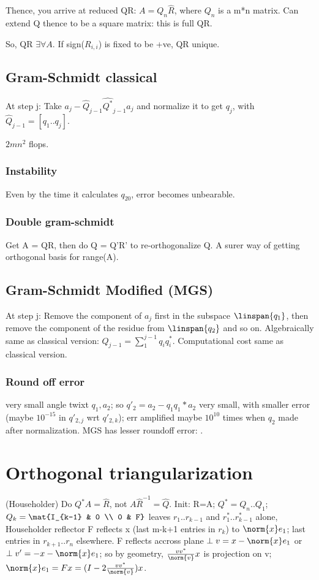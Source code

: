 \documentclass[oneside, article]{memoir}
\begin{document}
Thence, you arrive at reduced QR: $A=Q_n\hat{R}$, where $Q_n$ is a m*n matrix. Can extend Q thence to be a square matrix: this is full QR.

So, QR $\exists \forall A$. If sign($R_{i,i}$) is fixed to be +ve, QR unique. 

\subsection{Gram-Schmidt classical}
At step j: Take $a_j-\hat{Q}_{j-1}\hat{Q^{*}}_{j-1}a_j$ and normalize it to get $q_j$, with $\hat{Q}_{j-1} = [q_1 .. q_j]$.

$2mn^{2}$ flops.

\subsubsection{Instability}
Even by the time it calculates $q_{20}$, error becomes unbearable.

\subsubsection{Double gram-schmidt}
Get A = QR, then do Q = Q'R' to re-orthogonalize Q. A surer way of getting orthogonal basis for range(A).

\subsection{Gram-Schmidt Modified (MGS)}
At step j: Remove the component of $a_j$ first in the subspace $\linspan{q_1}$, then remove the component of the residue from $\linspan{q_2}$ and so on. Algebraically same as classical version: $Q_{j-1} = \sum_1^{j-1}q_iq_i^{*}$. Computational cost same as classical version.

\subsubsection{Round off error}
very small angle twixt $q_{1}, a_{2}$; so $q'_{2}=a_{2}-q_{1}q_{1}*a_{2}$ very small, with smaller error (maybe $10^{-15}$ in $q'_{2,j}$ wrt $q'_{2,k}$); err amplified maybe $10^{10}$ times when $q_{2}$ made after normalization. MGS has lesser roundoff error: \why.

\section{Orthogonal triangularization}
(Householder) Do $Q^{*}A = \hat{R}$, not $A\hat{R}^{-1} = \hat{Q}$. Init: R=A; $Q^{*} = Q_{n} .. Q_{1}$; $Q_{k} = \mat{I_{k-1} & 0 \\ 0 & F}$ leaves $r_{1} .. r_{k-1}$ and $r_{1}^{*} .. r_{k-1}^{*}$ alone, Householder reflector F reflects x (last m-k+1 entries in $r_{k}$) to $\norm{x}e_{1}$; last entries in $r_{k+1} .. r_{n}$ elsewhere. F reflects accross plane $\perp v = x - \norm{x}e_{1}$ or $\perp v' = -x - \norm{x}e_{1}$; so by geometry, $\frac{vv^{*}}{\norm{v}}x$ is projection on v; $\norm{x}e_{1} = Fx = (I - 2\frac{vv^{*}}{\norm{v}})x$.
\end{document}
